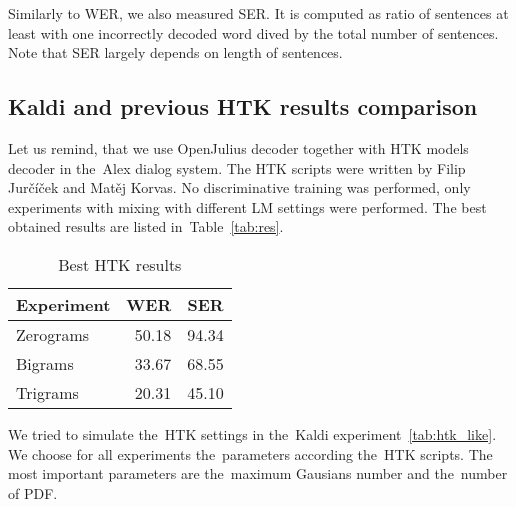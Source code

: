 Similarly to \ac{WER}, we also measured \ac{SER}. It is computed as ratio of sentences at least with one incorrectly decoded word dived by the total number of sentences. Note that \ac{SER} largely depends on length of sentences. 

\subsection[Kaldi and \acs{HTK} comparison]{Kaldi and previous \ac{HTK} results comparison} 
\label{sec:compare}



Let us remind, that we use OpenJulius decoder together with HTK models decoder in the~Alex dialog system.
The \ac{HTK} scripts were written by Filip Jurčíček and Matěj Korvas. No discriminative training was performed,
only experiments with mixing with different \acl{LM} settings were performed. 
The best obtained results are listed in~Table~\ref{tab:res}.

\begin{table}[!htp]\label{tab:htk_res}\centering\begin{tabular}{l|rr}
Experiment      & \ac{WER} & \ac{SER} \\
\hline
    Zerograms      & 50.18  & 94.34  \\
    Bigrams        & 33.67  & 68.55  \\
    Trigrams       & 20.31  & 45.10  \\
\end{tabular}
\caption{Best \ac{HTK} results}
\end{table}  


We tried to simulate the~\ac{HTK} settings in the~Kaldi experiment~\ref{tab:htk_like}.
We choose for all experiments the~parameters according the~\ac{HTK} scripts.
The most important parameters are the~maximum Gausians number and the~number of \acl{PDF}.

